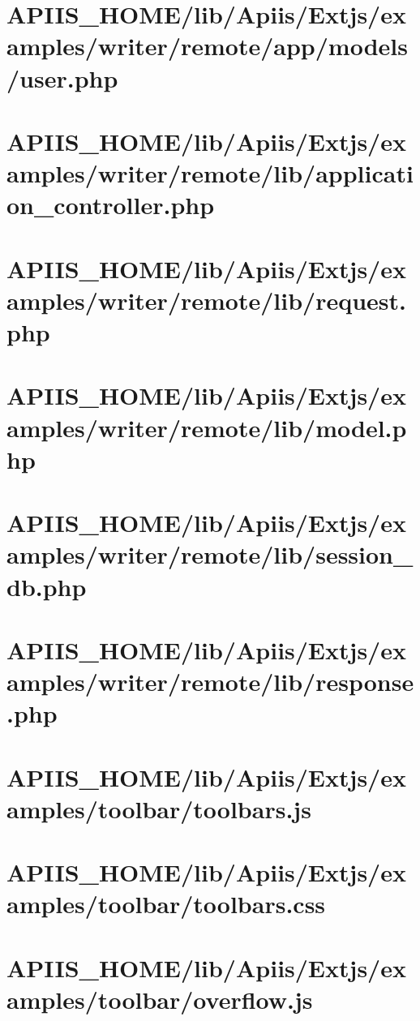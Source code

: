 \section{APIIS\_HOME/lib/Apiis/Extjs/examples/writer/remote/app/models/user.php} 
\section{APIIS\_HOME/lib/Apiis/Extjs/examples/writer/remote/lib/application\_controller.php} 
\section{APIIS\_HOME/lib/Apiis/Extjs/examples/writer/remote/lib/request.php} 
\section{APIIS\_HOME/lib/Apiis/Extjs/examples/writer/remote/lib/model.php} 
\section{APIIS\_HOME/lib/Apiis/Extjs/examples/writer/remote/lib/session\_db.php} 
\section{APIIS\_HOME/lib/Apiis/Extjs/examples/writer/remote/lib/response.php} 
\section{APIIS\_HOME/lib/Apiis/Extjs/examples/toolbar/toolbars.js} 
\section{APIIS\_HOME/lib/Apiis/Extjs/examples/toolbar/toolbars.css} 
\section{APIIS\_HOME/lib/Apiis/Extjs/examples/toolbar/overflow.js} 

